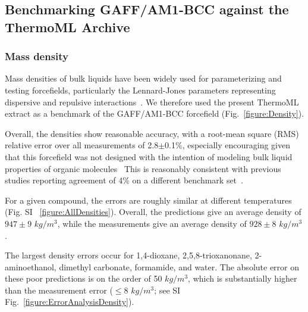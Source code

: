 \documentclass[aps,pre,twocolumn,nofootinbib,superscriptaddress,linenumbers]{revtex4-1}
\begin{document}

\subsection{Benchmarking GAFF/AM1-BCC against the ThermoML Archive}

\subsubsection{Mass density}

Mass densities of bulk liquids have been widely used for parameterizing and testing forcefields, particularly the Lennard-Jones parameters representing dispersive and repulsive interactions~\cite{jorgensen1983comparison, jorgensen1984optimized}.
We therefore used the present ThermoML extract as a benchmark of the GAFF/AM1-BCC forcefield (Fig.~\ref{figure:Density}).  

Overall, the densities show reasonable accuracy, with a root-mean square (RMS) relative error over all measurements of 2.8$\pm$0.1\%, especially encouraging given that this forcefield was not designed with the intention of modeling bulk liquid properties of organic molecules~\cite{gaff,gaff2}
This is reasonably consistent with previous studies reporting agreement of 4\% on a different benchmark set~\cite{caleman2011force}.

For a given compound, the errors are roughly similar at different temperatures (Fig. SI ~\ref{figure:AllDensities}).  Overall, the predictions give an average density of $947 \pm 9$ $kg / m^3$, while the measurements give an average density of $928 \pm 8$ $kg / m^3$.  

The largest density errors occur for 1,4-dioxane, 2,5,8-trioxanonane, 2-aminoethanol, dimethyl carbonate, formamide, and water.  The absolute error on these poor predictions is on the order of 50 $kg / m^3$, which is substantially higher than the measurement error ($\le 8$ $kg / m^3$; see SI Fig.~\ref{figure:ErrorAnalysisDensity}).  


\end{document}
